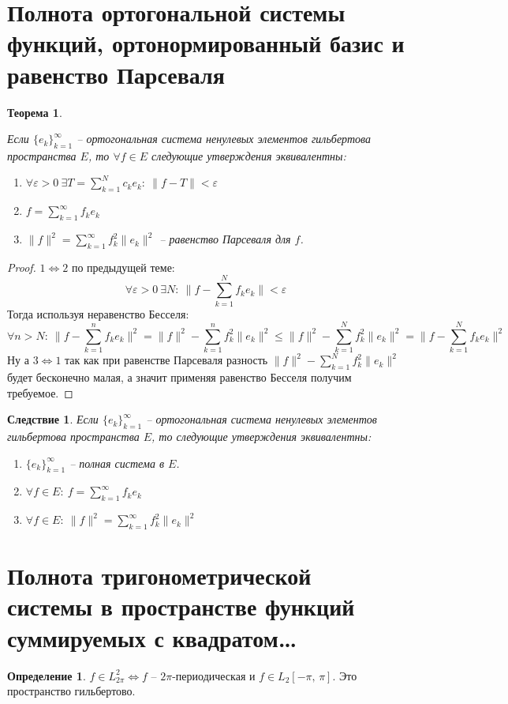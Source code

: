 \documentclass[a4paper,12pt]{article}
\renewcommand{\leq}{\ensuremath{\leqslant}}
\theoremstyle{plain}
\newtheorem{theorem}{Теорема}[section]
\newtheorem*{corollary}{Следствие}
\theoremstyle{definition}
\newtheorem{definition}{Определение}[section]
\theoremstyle{remark}
\begin{document}
\section{Полнота ортогональной системы функций, ортонормированный базис и равенство Парсеваля}
\begin{theorem}
	\label{THREE_EQUIV}

	Если $\{e_k\}_{k = 1}^\infty$ -- ортогональная система ненулевых элементов гильбертова пространства $E$, то $\forall f \in E$ следующие утверждения эквивалентны:
	\begin{enumerate}
		\item $\forall \varepsilon > 0 \: \exists T = \sum_{k = 1}^N c_ke_k :\: \|f - T\| < \varepsilon$
		\item $f = \sum_{k = 1}^\infty f_ke_k$
		\item $\|f\|^2 = \sum_{k = 1}^\infty f_k^2 \|e_k\|^2$ -- равенство Парсеваля для $f$.
	\end{enumerate}
\end{theorem}
\begin{proof}
	$1 \Leftrightarrow 2$ по предыдущей теме:
	\[\forall \varepsilon > 0 \: \exists N :\: \|f - \sum_{k = 1}^N f_ke_k\| < \varepsilon\]
	Тогда используя неравенство Бесселя:
	\[\forall n > N :\: \|f - \sum_{k = 1}^n f_ke_k\|^2 = \|f\|^2 - \sum_{k = 1}^n f_k^2\|e_k\|^2 \leq \|f\|^2 - \sum_{k = 1}^N f_k^2\|e_k\|^2 = \|f - \sum_{k = 1}^N f_ke_k\|^2\]
	Ну а $3 \Leftrightarrow 1$ так как при равенстве Парсеваля разность $\|f\|^2 - \sum_{k = 1}^N f_k^2\|e_k\|^2$ будет бесконечно малая, а значит применяя равенство Бесселя получим требуемое.
\end{proof}

\begin{corollary}
	Если $\{e_k\}_{k = 1}^\infty$ -- ортогональная система ненулевых элементов гильбертова пространства $E$, то следующие утверждения эквивалентны:
	\begin{enumerate}
		\item $\{e_k\}_{k = 1}^\infty$ -- полная система в $E$.
		\item $\forall f \in E:\: f = \sum_{k = 1}^\infty f_ke_k$
		\item $\forall f \in E:\: \|f\|^2 = \sum_{k = 1}^\infty f_k^2\|e_k\|^2$
	\end{enumerate}
\end{corollary}

\section{Полнота тригонометрической системы в пространстве функций суммируемых с квадратом\dots}
\begin{definition}
	$f \in L_{2\pi}^2 \Leftrightarrow f$ -- $2\pi$-периодическая и $f \in L_2[-\pi,\,\pi]$. Это пространство гильбертово.
\end{definition}
\end{document}
